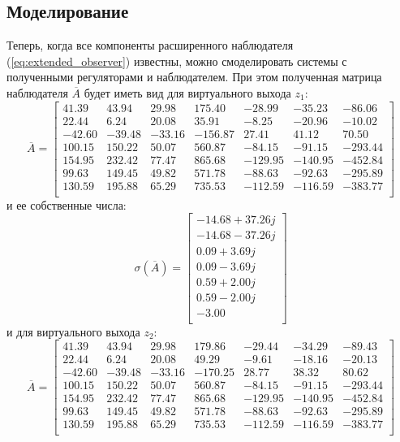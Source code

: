 \subsection{Моделирование}
Теперь, когда все компоненты расширенного наблюдателя (\ref{eq:extended_observer}) известны, 
можно смоделировать системы с полученными регуляторами и наблюдателем. При этом полученная матрица 
наблюдателя $\overline{A}$ будет иметь вид для виртуального выхода $z_1$:
\begin{equation}
    \overline{A} = \begin{bmatrix}
        41.39  & 43.94  & 29.98  & 175.40  & -28.99  & -35.23  & -86.06 \\ 
        22.44  & 6.24  & 20.08  & 35.91  & -8.25  & -20.96  & -10.02 \\ 
        -42.60  & -39.48  & -33.16  & -156.87  & 27.41  & 41.12  & 70.50 \\ 
        100.15  & 150.22  & 50.07  & 560.87  & -84.15  & -91.15  & -293.44 \\ 
        154.95  & 232.42  & 77.47  & 865.68  & -129.95  & -140.95  & -452.84 \\ 
        99.63  & 149.45  & 49.82  & 571.78  & -88.63  & -92.63  & -295.89 \\ 
        130.59  & 195.88  & 65.29  & 735.53  & -112.59  & -116.59  & -383.77 \\ 
    \end{bmatrix}
\end{equation}
и ее собственные числа: 
\begin{equation}
    \sigma(\overline{A}) = \begin{bmatrix}
        -14.68 + 37.26j \\ 
        -14.68 - 37.26j \\ 
        0.09 + 3.69j \\ 
        0.09 - 3.69j \\ 
        0.59 + 2.00j \\ 
        0.59 - 2.00j \\ 
        -3.00 \\ 
    \end{bmatrix}
\end{equation}
и для виртуального выхода $z_2$:
\begin{equation}
    \overline{A} = \begin{bmatrix}
        41.39  & 43.94  & 29.98  & 179.86  & -29.44  & -34.29  & -89.43 \\ 
        22.44  & 6.24  & 20.08  & 49.29  & -9.61  & -18.16  & -20.13 \\ 
        -42.60  & -39.48  & -33.16  & -170.25  & 28.77  & 38.32  & 80.62 \\ 
        100.15  & 150.22  & 50.07  & 560.87  & -84.15  & -91.15  & -293.44 \\ 
        154.95  & 232.42  & 77.47  & 865.68  & -129.95  & -140.95  & -452.84 \\ 
        99.63  & 149.45  & 49.82  & 571.78  & -88.63  & -92.63  & -295.89 \\ 
        130.59  & 195.88  & 65.29  & 735.53  & -112.59  & -116.59  & -383.77 \\ 
    \end{bmatrix}
\end{equation}
